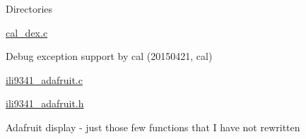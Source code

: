 \begin{DoxyParagraph}{Directories}
\begin{DoxyItemize}
\begin{DoxyItemize}
\item \hyperlink{cal__dex_8c}{cal\+\_\+dex.\+c}
\begin{DoxyItemize}
\item Debug exception support by cal (20150421, cal)
\end{DoxyItemize}
\item \hyperlink{ili9341__adafruit_8c}{ili9341\+\_\+adafruit.\+c}
\item \hyperlink{ili9341__adafruit_8h}{ili9341\+\_\+adafruit.\+h}
\begin{DoxyItemize}
\item Adafruit display -\/ just those few functions that I have not rewritten
\end{DoxyItemize}
\end{DoxyItemize}
\end{DoxyItemize}
\end{DoxyParagraph}

